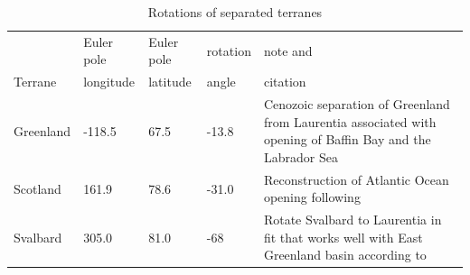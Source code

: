 \documentclass[twocolumn, switch]{article} %
\begin{document}
\begin{table}[hbt]
\caption{Rotations of separated terranes}
{\scriptsize
\begin{tabular}{|l|l|l|l|p{1.1 in}|}
  \hline
& Euler pole & Euler pole & rotation & note and \\
Terrane & longitude & latitude & angle & citation \\
\hline
Greenland & -118.5 & 67.5 & -13.8 & Cenozoic separation of Greenland from Laurentia associated with opening of Baffin Bay and the Labrador Sea \citep{Roest1989a} \\
\hline
Scotland & 161.9 & 78.6 & -31.0 & Reconstruction of Atlantic Ocean opening following \cite{Torsvik2017a} \\
\hline
Svalbard & 305.0 & 81.0 & -68 & Rotate Svalbard to Laurentia in fit that works well with East Greenland basin according to \cite{Maloof2006a}\\
\hline
\end{tabular}
}
\label{tab:terrane_rotations}
\end{table}
\end{document}
